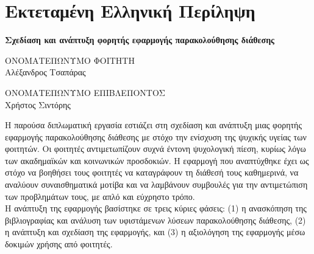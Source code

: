 \chapter*{Εκτεταμένη Ελληνική Περίληψη}

\begin{center}
    {\Large \textbf{Σχεδίαση και ανάπτυξη φορητής εφαρμογής παρακολούθησης διάθεσης}}
\end{center}

\vspace{5mm}

\begin{minipage}[t]{0.45\textwidth}
    \begin{center}
        ΟΝΟΜΑΤΕΠΩΝΥΜΟ ΦΟΙΤΗΤΗ \\[2em]
        Αλέξανδρος Τσαπάρας \\[0.5em]
    \end{center}
\end{minipage}%
\hfill
\begin{minipage}[t]{0.45\textwidth}
    \begin{center}
        ΟΝΟΜΑΤΕΠΩΝΥΜΟ ΕΠΙΒΛΕΠΟΝΤΟΣ \\[0.2em]
        Χρήστος Σιντόρης \\[0.5em]
    \end{center}
\end{minipage}

\vspace{3em}

\noindent Η παρούσα διπλωματική εργασία εστιάζει στη σχεδίαση και ανάπτυξη μιας φορητής εφαρμογής παρακολούθησης διάθεσης με στόχο την ενίσχυση της ψυχικής υγείας των φοιτητών. Οι φοιτητές αντιμετωπίζουν συχνά έντονη ψυχολογική πίεση, κυρίως λόγω των ακαδημαϊκών και κοινωνικών προσδοκιών. Η εφαρμογή που αναπτύχθηκε έχει ως στόχο να βοηθήσει τους φοιτητές να καταγράφουν τη διάθεσή τους καθημερινά, να αναλύουν συναισθηματικά μοτίβα και να λαμβάνουν συμβουλές για την αντιμετώπιση των προβλημάτων τους, με απλό και εύχρηστο τρόπο.\vspace{5mm} \\
Η ανάπτυξη της εφαρμογής βασίστηκε σε τρεις κύριες φάσεις: (1) η ανασκόπηση της βιβλιογραφίας και ανάλυση των υφιστάμενων λύσεων παρακολούθησης διάθεσης, (2) η ανάπτυξη και σχεδίαση της εφαρμογής, και (3) η αξιολόγηση της εφαρμογής μέσω δοκιμών χρήσης από φοιτητές.


